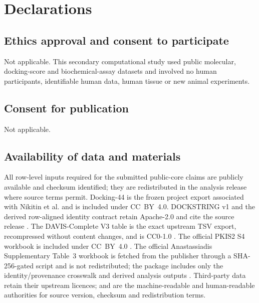 \section*{Declarations}

\subsection*{Ethics approval and consent to participate}

Not applicable.  This secondary computational study used public molecular,
docking-score and biochemical-assay datasets and involved no human participants,
identifiable human data, human tissue or new animal experiments.

\subsection*{Consent for publication}

Not applicable.

\subsection*{Availability of data and materials}

All row-level inputs required for the submitted public-core claims are publicly
available and checksum identified; they are redistributed in the analysis
release where source terms permit.
Docking-44 is the frozen project export associated with Nikitin et al.
\cite{nikitin2025} and is included under CC~BY~4.0.  DOCKSTRING v1 and the
derived row-aligned identity contract retain Apache-2.0 and cite the source
release \cite{dockstring2022}.  The DAVIS-Complete V3 table is the exact upstream
TSV export, recompressed without content changes, and is CC0-1.0
\cite{davis2011,wu2025davis}.  The official PKIS2 S4 workbook is included under
CC~BY~4.0 \cite{drewry2017}. The official Anastassiadis Supplementary Table~3
workbook is fetched from the publisher through a SHA-256-gated script and is
not redistributed; the package includes only the identity/provenance crosswalk
and derived analysis outputs \cite{anastassiadis2011}. Third-party data retain their upstream licences;
 and  are the machine-readable
and human-readable authorities for source version, checksum and redistribution
terms.

